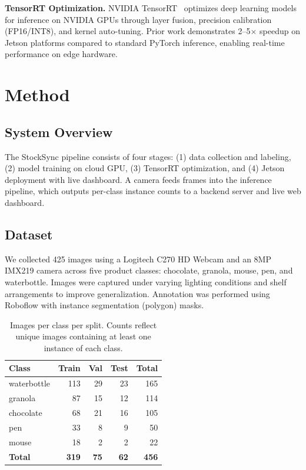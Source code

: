 \documentclass[10pt,twocolumn,letterpaper]{article}
\begin{document}
\noindent\textbf{TensorRT Optimization.}
NVIDIA TensorRT~\cite{tensorrt} optimizes deep learning
models for inference on NVIDIA GPUs through layer fusion,
precision calibration (FP16/INT8), and kernel auto-tuning.
Prior work demonstrates 2--5$\times$ speedup on Jetson
platforms compared to standard PyTorch inference, enabling
real-time performance on edge hardware.

\section{Method}

\subsection{System Overview}

The StockSync pipeline consists of four stages: (1) data
collection and labeling, (2) model training on cloud GPU,
(3) TensorRT optimization, and (4) Jetson deployment with
live dashboard. A camera feeds frames into the inference
pipeline, which outputs per-class instance counts to a
backend server and live web dashboard.

\subsection{Dataset}

We collected 425 images using a Logitech C270 HD Webcam and
an 8MP IMX219 camera across five product classes: chocolate,
granola, mouse, pen, and waterbottle. Images were captured
under varying lighting conditions and shelf arrangements to
improve generalization. Annotation was performed using
Roboflow with instance segmentation (polygon) masks.

\begin{table}[h]
\centering
\small
\begin{tabular}{lrrrr}
\toprule
\textbf{Class} & \textbf{Train} & \textbf{Val} &
\textbf{Test} & \textbf{Total} \\
\midrule
waterbottle & 113 & 29 & 23 & 165 \\
granola     &  87 & 15 & 12 & 114 \\
chocolate   &  68 & 21 & 16 & 105 \\
pen         &  33 &  8 &  9 &  50 \\
mouse       &  18 &  2 &  2 &  22 \\
\midrule
\textbf{Total} & \textbf{319} & \textbf{75} &
\textbf{62} & \textbf{456} \\
\bottomrule
\end{tabular}
\caption{Images per class per split. Counts reflect unique
images containing at least one instance of each class.}
\label{tab:dataset}
\end{table}
\end{document}
